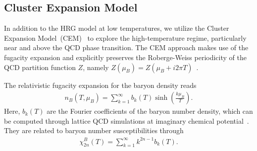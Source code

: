 \documentclass[%
 reprint,
nofootinbib,
 amsmath,amssymb,
 aps,
prc
]{revtex4-2}
\begin{document}
\subsection{\label{CE}{Cluster Expansion Model}}

In addition to the HRG model at low temperatures, we utilize the Cluster Expansion Model~(CEM)~\cite{Vovchenko:2017gkg,Vovchenko:2018zgt} to explore the high-temperature regime, particularly near and above the QCD phase transition. 
The CEM approach makes use of the fugacity expansion and explicitly preserves the Roberge-Weiss periodicity of the QCD partition function $Z$, namely $Z(\mu_B) = Z(\mu_B + i2\pi T)$~\cite{Roberge:1986mm}.
 
The relativistic fugacity expansion for the baryon density reads
\begin{align}
\label{eq:nBFug}
    n_B(T,\mu_B)=\sum_{k=1}^\infty b_k(T)\sinh\left(\frac{k\mu_B}{T}\right).
\end{align} 
Here, $b_k(T)$ are the Fourier coefficients of the baryon number density, which can be computed through lattice QCD simulations at imaginary chemical potential~\cite{Vovchenko:2017xad,Bellwied:2021nrt}.
They are related to baryon number susceptibilities through
\begin{align}
\chi_{2n}^B(T) = \sum_{k=1}^\infty k^{2n-1}b_k(T).
\label{Eq:chi_CEM}
\end{align} 
\end{document}
